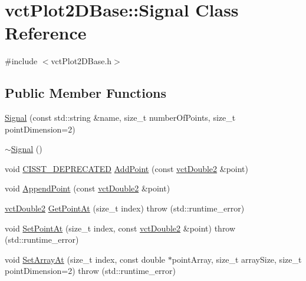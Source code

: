 \hypertarget{classvct_plot2_d_base_1_1_signal}{}\section{vct\+Plot2\+D\+Base\+:\+:Signal Class Reference}
\label{classvct_plot2_d_base_1_1_signal}


{\ttfamily \#include $<$vct\+Plot2\+D\+Base.\+h$>$}

\subsection*{Public Member Functions}
\begin{DoxyCompactItemize}
\item 
\hyperlink{classvct_plot2_d_base_1_1_signal_ab095234489c14783246b6037ea6c1820}{Signal} (const std\+::string \&name, size\+\_\+t number\+Of\+Points, size\+\_\+t point\+Dimension=2)
\item 
\hyperlink{classvct_plot2_d_base_1_1_signal_a74fd6d127a4f44cabf148f7b7267e036}{$\sim$\+Signal} ()
\item 
void \hyperlink{cmn_portability_8h_a63da7164735f9501be651b1f2bbc0121}{C\+I\+S\+S\+T\+\_\+\+D\+E\+P\+R\+E\+C\+A\+T\+E\+D} \hyperlink{classvct_plot2_d_base_1_1_signal_a1f5b48d4843fef660afac788f09d20ab}{Add\+Point} (const \hyperlink{vct_fixed_size_vector_types_8h_afc0fdcc41cbe8b043747612501610812}{vct\+Double2} \&point)
\item 
void \hyperlink{classvct_plot2_d_base_1_1_signal_a05c35a4ab52fefa871268ef952d31e50}{Append\+Point} (const \hyperlink{vct_fixed_size_vector_types_8h_afc0fdcc41cbe8b043747612501610812}{vct\+Double2} \&point)
\item 
\hyperlink{vct_fixed_size_vector_types_8h_afc0fdcc41cbe8b043747612501610812}{vct\+Double2} \hyperlink{classvct_plot2_d_base_1_1_signal_a3d37044fdbd4cf336c04851a775be70c}{Get\+Point\+At} (size\+\_\+t index)  throw (std\+::runtime\+\_\+error)
\item 
void \hyperlink{classvct_plot2_d_base_1_1_signal_ae7234b9ab496f6af9713b34ecc80123a}{Set\+Point\+At} (size\+\_\+t index, const \hyperlink{vct_fixed_size_vector_types_8h_afc0fdcc41cbe8b043747612501610812}{vct\+Double2} \&point)  throw (std\+::runtime\+\_\+error)
\item 
void \hyperlink{classvct_plot2_d_base_1_1_signal_acac355be74456036634f204da1169c76}{Set\+Array\+At} (size\+\_\+t index, const double $\ast$point\+Array, size\+\_\+t array\+Size, size\+\_\+t point\+Dimension=2)  throw (std\+::runtime\+\_\+error)

\end{DoxyCompactItemize}
